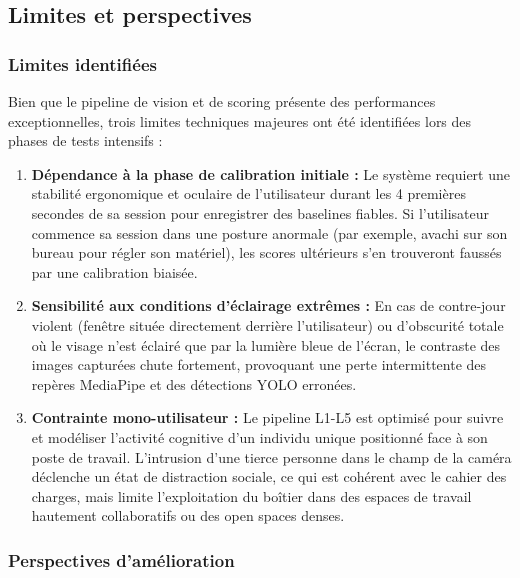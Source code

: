 \subsection{Limites et perspectives}

\subsubsection{Limites identifiées}

Bien que le pipeline de vision et de scoring présente des performances exceptionnelles, trois limites techniques majeures ont été identifiées lors des phases de tests intensifs :
\begin{enumerate}
    \item \textbf{Dépendance à la phase de calibration initiale :} Le système requiert une stabilité ergonomique et oculaire de l'utilisateur durant les 4 premières secondes de sa session pour enregistrer des baselines fiables. Si l'utilisateur commence sa session dans une posture anormale (par exemple, avachi sur son bureau pour régler son matériel), les scores ultérieurs s'en trouveront faussés par une calibration biaisée.
    \item \textbf{Sensibilité aux conditions d'éclairage extrêmes :} En cas de contre-jour violent (fenêtre située directement derrière l'utilisateur) ou d'obscurité totale où le visage n'est éclairé que par la lumière bleue de l'écran, le contraste des images capturées chute fortement, provoquant une perte intermittente des repères MediaPipe et des détections YOLO erronées.
    \item \textbf{Contrainte mono-utilisateur :} Le pipeline L1-L5 est optimisé pour suivre et modéliser l'activité cognitive d'un individu unique positionné face à son poste de travail. L'intrusion d'une tierce personne dans le champ de la caméra déclenche un état de distraction sociale, ce qui est cohérent avec le cahier des charges, mais limite l'exploitation du boîtier dans des espaces de travail hautement collaboratifs ou des open spaces denses.
\end{enumerate}

\subsubsection{Perspectives d’amélioration}

